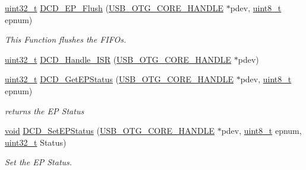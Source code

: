 \begin{DoxyCompactItemize}
\hyperlink{stdint_8h_a435d1572bf3f880d55459d9805097f62}{uint32\-\_\-t} \hyperlink{group___u_s_b___d_c_d___exported___functions_prototype_ga60384fbc64829d957de52fe32a9a70a8}{D\-C\-D\-\_\-\-E\-P\-\_\-\-Flush} (\hyperlink{group___u_s_b___c_o_r_e___exported___types_gaf76054c11eb8a3367907aad7ae700e80}{U\-S\-B\-\_\-\-O\-T\-G\-\_\-\-C\-O\-R\-E\-\_\-\-H\-A\-N\-D\-L\-E} $\ast$pdev, \hyperlink{stdint_8h_aba7bc1797add20fe3efdf37ced1182c5}{uint8\-\_\-t} epnum)
\begin{DoxyCompactList}\small\item\em This Function flushes the F\-I\-F\-Os. \end{DoxyCompactList}\item 
\hyperlink{stdint_8h_a435d1572bf3f880d55459d9805097f62}{uint32\-\_\-t} \hyperlink{group___u_s_b___d_c_d___exported___functions_prototype_ga5dc6c8009ab2aa94319fe62d3a9d813b}{D\-C\-D\-\_\-\-Handle\-\_\-\-I\-S\-R} (\hyperlink{group___u_s_b___c_o_r_e___exported___types_gaf76054c11eb8a3367907aad7ae700e80}{U\-S\-B\-\_\-\-O\-T\-G\-\_\-\-C\-O\-R\-E\-\_\-\-H\-A\-N\-D\-L\-E} $\ast$pdev)
\item 
\hyperlink{stdint_8h_a435d1572bf3f880d55459d9805097f62}{uint32\-\_\-t} \hyperlink{group___u_s_b___d_c_d___exported___functions_prototype_ga4c90c3ca8ad2f5dda0de937ddc2c115c}{D\-C\-D\-\_\-\-Get\-E\-P\-Status} (\hyperlink{group___u_s_b___c_o_r_e___exported___types_gaf76054c11eb8a3367907aad7ae700e80}{U\-S\-B\-\_\-\-O\-T\-G\-\_\-\-C\-O\-R\-E\-\_\-\-H\-A\-N\-D\-L\-E} $\ast$pdev, \hyperlink{stdint_8h_aba7bc1797add20fe3efdf37ced1182c5}{uint8\-\_\-t} epnum)
\begin{DoxyCompactList}\small\item\em returns the E\-P Status \end{DoxyCompactList}\item 
\hyperlink{group___n_a_m_e_ga18028b8badbf1ea7e704ccac3c488e82}{void} \hyperlink{group___u_s_b___d_c_d___exported___functions_prototype_ga38147684b1cc15f071ef305a8f50320b}{D\-C\-D\-\_\-\-Set\-E\-P\-Status} (\hyperlink{group___u_s_b___c_o_r_e___exported___types_gaf76054c11eb8a3367907aad7ae700e80}{U\-S\-B\-\_\-\-O\-T\-G\-\_\-\-C\-O\-R\-E\-\_\-\-H\-A\-N\-D\-L\-E} $\ast$pdev, \hyperlink{stdint_8h_aba7bc1797add20fe3efdf37ced1182c5}{uint8\-\_\-t} epnum, \hyperlink{stdint_8h_a435d1572bf3f880d55459d9805097f62}{uint32\-\_\-t} Status)
\begin{DoxyCompactList}\small\item\em Set the E\-P Status. \end{DoxyCompactList}\end{DoxyCompactItemize}


